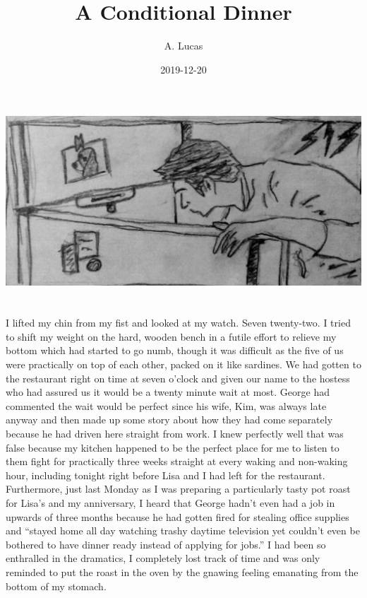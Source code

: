 \documentclass[]{book}
\title{A Conditional Dinner}
\author{A. Lucas}
\date{2019-12-20}
\begin{document}
\maketitle

{
\setcounter{tocdepth}{1}
\tableofcontents
}
\chapter*{}\label{section}

\begin{flushleft}\includegraphics[width=0.5\linewidth]{images/titleimage} \end{flushleft}

\chapter{}\label{section-1}

I lifted my chin from my fist and looked at my watch. Seven twenty-two.
I tried to shift my weight on the hard, wooden bench in a futile effort
to relieve my bottom which had started to go numb, though it was
difficult as the five of us were practically on top of each other,
packed on it like sardines. We had gotten to the restaurant right on
time at seven o'clock and given our name to the hostess who had assured
us it would be a twenty minute wait at most. George had commented the
wait would be perfect since his wife, Kim, was always late anyway and
then made up some story about how they had come separately because he
had driven here straight from work. I knew perfectly well that was false
because my kitchen happened to be the perfect place for me to listen to
them fight for practically three weeks straight at every waking and
non-waking hour, including tonight right before Lisa and I had left for
the restaurant. Furthermore, just last Monday as I was preparing a
particularly tasty pot roast for Lisa's and my anniversary, I heard that
George hadn't even had a job in upwards of three months because he had
gotten fired for stealing office supplies and ``stayed home all day
watching trashy daytime television yet couldn't even be bothered to have
dinner ready instead of applying for jobs.'' I had been so enthralled in
the dramatics, I completely lost track of time and was only reminded to
put the roast in the oven by the gnawing feeling emanating from the
bottom of my stomach.
\end{document}
